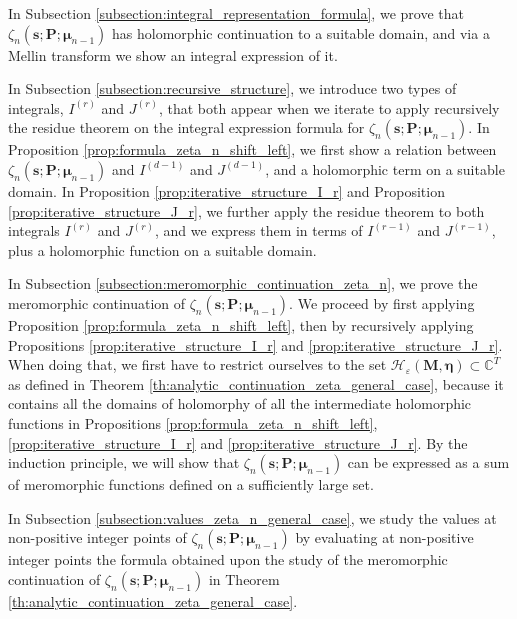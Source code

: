 \documentclass[a4paper,12pt]{article}
\theoremstyle{definition}
\numberwithin{equation}{section}
\begin{document}
In Subsection \ref{subsection:integral_representation_formula}, we prove that $\zeta_{n}(\mathbf{s};\mathbf{P};\boldsymbol{\mu}_{n-1})$ has holomorphic continuation to a suitable domain, and via a Mellin transform we show an integral expression of it.

In Subsection \ref{subsection:recursive_structure}, we introduce two types of integrals, $I^{(r)}$ and $J^{(r)}$, that both appear when we iterate to apply recursively the residue theorem on the integral expression formula for $\zeta_{n}(\mathbf{s};\mathbf{P};\boldsymbol{\mu}_{n-1})$. In Proposition \ref{prop:formula_zeta_n_shift_left}, we first show a relation between $\zeta_{n}(\mathbf{s};\mathbf{P};\boldsymbol{\mu}_{n-1})$ and $I^{(d-1)}$ and $J^{(d-1)}$, and a holomorphic term on a suitable domain. In Proposition \ref{prop:iterative_structure_I_r} and Proposition \ref{prop:iterative_structure_J_r}, we further apply the residue theorem to both integrals $I^{(r)}$ and $J^{(r)}$, and we express them in terms of $I^{(r-1)}$ and $J^{(r-1)}$, plus a holomorphic function on a suitable domain.

In Subsection \ref{subsection:meromorphic_continuation_zeta_n}, we prove the meromorphic continuation of $\zeta_{n}(\mathbf{s};\mathbf{P};\boldsymbol{\mu}_{n-1})$. We proceed by first applying Proposition \ref{prop:formula_zeta_n_shift_left}, then by recursively applying Propositions \ref{prop:iterative_structure_I_r} and \ref{prop:iterative_structure_J_r}. When doing that, we first have to restrict ourselves to the set $\mathcal{H}_{\varepsilon}(\mathbf{M},\boldsymbol{\eta}) \subset \mathbb{C}^T$ as defined in Theorem \ref{th:analytic_continuation_zeta_general_case}, because it contains all the domains of holomorphy of all the intermediate holomorphic functions in Propositions \ref{prop:formula_zeta_n_shift_left}, \ref{prop:iterative_structure_I_r} and \ref{prop:iterative_structure_J_r}. By the induction principle, we will show that $\zeta_{n}(\mathbf{s};\mathbf{P};\boldsymbol{\mu}_{n-1})$ can be expressed as a sum of meromorphic functions defined on a sufficiently large set.

In Subsection \ref{subsection:values_zeta_n_general_case}, we study the values at non-positive integer points of $\zeta_{n}(\mathbf{s};\mathbf{P};\boldsymbol{\mu}_{n-1})$ by evaluating at non-positive integer points the formula obtained upon the study of the meromorphic continuation of $\zeta_{n}(\mathbf{s};\mathbf{P};\boldsymbol{\mu}_{n-1})$ in Theorem \ref{th:analytic_continuation_zeta_general_case}.
\end{document}
